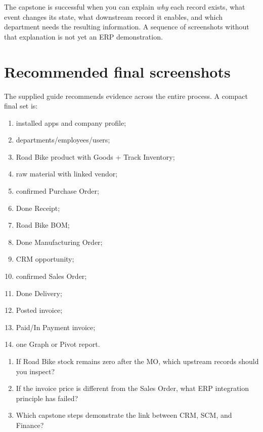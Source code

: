 \begin{keyidea}
The capstone is successful when you can explain \emph{why} each record exists, what event changes its state, what downstream record it enables, and which department needs the resulting information. A sequence of screenshots without that explanation is not yet an ERP demonstration.
\end{keyidea}

\section*{Recommended final screenshots}

The supplied guide recommends evidence across the entire process. A compact final set is:

\begin{enumerate}
  \item installed apps and company profile;
  \item departments/employees/users;
  \item Road Bike product with Goods + Track Inventory;
  \item raw material with linked vendor;
  \item confirmed Purchase Order;
  \item Done Receipt;
  \item Road Bike BOM;
  \item Done Manufacturing Order;
  \item CRM opportunity;
  \item confirmed Sales Order;
  \item Done Delivery;
  \item Posted invoice;
  \item Paid/In Payment invoice;
  \item one Graph or Pivot report.
\end{enumerate}

\begin{quickcheck}
\begin{enumerate}
  \item If Road Bike stock remains zero after the MO, which upstream records should you inspect?
  \item If the invoice price is different from the Sales Order, what ERP integration principle has failed?
  \item Which capstone steps demonstrate the link between CRM, SCM, and Finance?
\end{enumerate}
\end{quickcheck}
